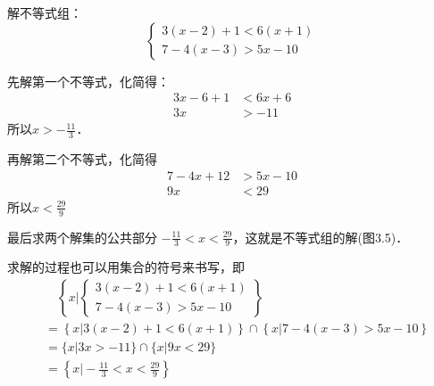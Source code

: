 \begin{example}
    解不等式组：
    \[\begin{cases}
        3(x-2)+1<6(x+1)\\
        7-4(x-3)>5x-10
    \end{cases}\]
\end{example}

\begin{solution}
    先解第一个不等式，化简得：
\[\begin{split}
    3x-6+1&<6x+6\\
    3x&>-11
\end{split}\]
所以$x>-\frac{11}{3}$．

再解第二个不等式，化简得
\[\begin{split}
    7-4x+12&>5x-10\\
    9x&<29
\end{split}\]
所以$x<\frac{29}{9}$

最后求两个解集的公共部分 $-\frac{11}{3}<x<\frac{29}{9}$，这就是不等式组的解(图3.5)．

\begin{figure}[htp]
    \centering
    \caption{}
\end{figure}

求解的过程也可以用集合的符号来书写，即
\[\begin{split}
&\quad \left\{x\Big|\begin{cases}
    3(x-2)+1<6(x+1)\\
    7-4(x-3)>5x-10
\end{cases}  \right\}\\
&=\left\{x\Big|3(x-2)+1<6(x+1) \right\} \cap \left\{x\Big|7-4(x-3)>5x-10 \right\}    \\
&=\{x|3x>-11\}\cap\{x|9x<29\}\\
&=\left\{x\Big|-\frac{11}{3}<x<\frac{29}{9} \right\}
\end{split}\]

\end{solution}

